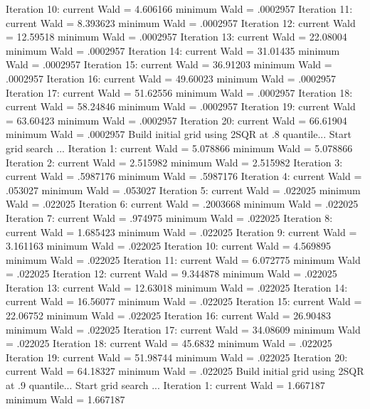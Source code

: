 Iteration    10:  current Wald =  4.606166         minimum Wald =  .0002957
Iteration    11:  current Wald =  8.393623         minimum Wald =  .0002957
Iteration    12:  current Wald =  12.59518         minimum Wald =  .0002957
Iteration    13:  current Wald =  22.08004         minimum Wald =  .0002957
Iteration    14:  current Wald =  31.01435         minimum Wald =  .0002957
Iteration    15:  current Wald =  36.91203         minimum Wald =  .0002957
Iteration    16:  current Wald =  49.60023         minimum Wald =  .0002957
Iteration    17:  current Wald =  51.62556         minimum Wald =  .0002957
Iteration    18:  current Wald =  58.24846         minimum Wald =  .0002957
Iteration    19:  current Wald =  63.60423         minimum Wald =  .0002957
Iteration    20:  current Wald =  66.61904         minimum Wald =  .0002957
{\smallskip}
Build initial grid using 2SQR at .8 quantile...
{\smallskip}
Start grid search ...
Iteration     1:  current Wald =  5.078866         minimum Wald =  5.078866
Iteration     2:  current Wald =  2.515982         minimum Wald =  2.515982
Iteration     3:  current Wald =  .5987176         minimum Wald =  .5987176
Iteration     4:  current Wald =   .053027         minimum Wald =   .053027
Iteration     5:  current Wald =   .022025         minimum Wald =   .022025
Iteration     6:  current Wald =  .2003668         minimum Wald =   .022025
Iteration     7:  current Wald =   .974975         minimum Wald =   .022025
Iteration     8:  current Wald =  1.685423         minimum Wald =   .022025
Iteration     9:  current Wald =  3.161163         minimum Wald =   .022025
Iteration    10:  current Wald =  4.569895         minimum Wald =   .022025
Iteration    11:  current Wald =  6.072775         minimum Wald =   .022025
Iteration    12:  current Wald =  9.344878         minimum Wald =   .022025
Iteration    13:  current Wald =  12.63018         minimum Wald =   .022025
Iteration    14:  current Wald =  16.56077         minimum Wald =   .022025
Iteration    15:  current Wald =  22.06752         minimum Wald =   .022025
Iteration    16:  current Wald =  26.90483         minimum Wald =   .022025
Iteration    17:  current Wald =  34.08609         minimum Wald =   .022025
Iteration    18:  current Wald =   45.6832         minimum Wald =   .022025
Iteration    19:  current Wald =  51.98744         minimum Wald =   .022025
Iteration    20:  current Wald =  64.18327         minimum Wald =   .022025
{\smallskip}
Build initial grid using 2SQR at .9 quantile...
{\smallskip}
Start grid search ...
Iteration     1:  current Wald =  1.667187         minimum Wald =  1.667187

